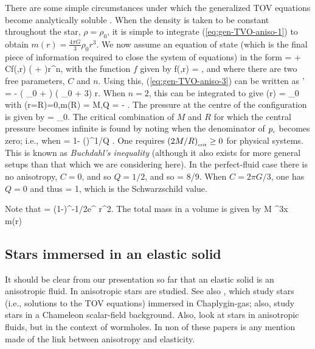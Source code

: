 There are some simple circumstances under which the generalized TOV equations become analytically soluble \cite{1974ApJ...188..657B}. When the density is taken to be constant throughout the star, $\rho = \rho_0$, it is simple to integrate (\ref{eq:gen-TVO-aniso-1}) to obtain $m(r) = \frac{4\pi G}{3}\rho_0 r^3$. We now assume an equation of state (which is the final piece of information required to close the system of equations) in the form
\bse
\bea
{} =  + Cf(,r) \left( \rho + \right)r^n,
\eea
with the function $f$ given by
\bea
f(,r) = ,
\eea
\ese
and where there are two free parameters, $C$ and $n$. Using this,  (\ref{eq:gen-TVO-aniso-3}) can be written as
\bea
{}' = - \left( \rho_0 + \right) \left( \rho_0 + 3\right)  r.
\eea
When $n=2$, this can be integrated to give
\bea
{}(r) = \rho_0 
\eea
with
\bea
{}(r=R)=0,\qquad m(R) = M,\qquad Q = \half - .
\eea
The pressure at the centre of the configuration is given by
\bea
{} = \rho_0.
\eea
The critical combination of $M$ and $R$ for which the central pressure becomes infinite is found  by noting when the denominator of ${p}_{\scriptscriptstyle{\textrm{c}}}$ becomes zero; i.e., when
\bea
{} = 1- \left(\right)^{1/Q} .
\eea
One requires ${\left(2M/R\right)}_{\scriptscriptstyle{\textrm{crit}}}\geq 0$ for physical systems. This is known as \textit{Buchdahl's inequality} \cite{PhysRev.116.1027, 1964ApJ...140..434T} (although it also exists for more general setups than that which we are considering here). In the perfect-fluid case there is no anisotropy, $C = 0$, and so $Q= 1/2$, and so
\bea
{} = 8/9.
\eea
When $C = 2\pi G /3$, one has $Q=0$ and thus
\bea
{} = 1,
\eea
which is the Schwarzschild value.

Note that 
\bea
{} = \left(1-\right)^{-1/2}e^{\nu} r^2\sin\theta.
\eea
The total mass in a volume is given by
\bea
M  \int \dd^3x\, \, m(r) 
\eea

\subsection{Stars immersed in an elastic solid}
It should be clear from our presentation so far that an elastic solid is an anisotropic fluid. In \cite{1974ApJ...188..657B, Dev:2000gt, Mak:2001eb, Dev:2003qd, Das:2003wm} anisotropic stars are studied. See also \cite{Gorini:2008zj, Gorini:2009em}, which study stars (i.e., solutions to the TOV equations) immersed in Chaplygin-gas; also, \cite{Folomeev:2013hoa} study stars in a Chameleon scalar-field background. Also, \cite{Dzhunushaliev:2014mza} look at stars in anisotropic fluids, but in the context of wormholes. In non of these papers is any mention made of the link between anisotropy and elasticity.

